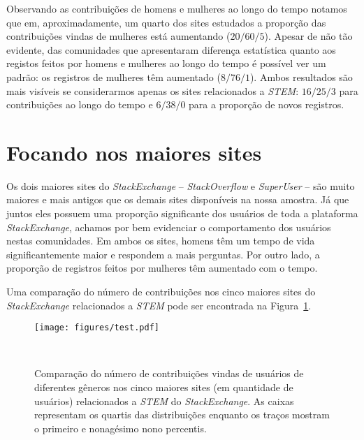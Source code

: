 Observando as contribuições de homens e mulheres ao longo do tempo notamos que em, aproximadamente, um quarto dos sites estudados a proporção das contribuições vindas de mulheres está aumentando ($20/60/5$). Apesar de não tão evidente, das comunidades que apresentaram diferença estatística quanto aos registos feitos por homens e mulheres ao longo do tempo é possível ver um padrão: os registros de mulheres têm aumentado ($8/76/1$). Ambos resultados são mais visíveis se considerarmos apenas os sites relacionados a \emph{STEM}: $16/25/3$ para contribuições ao longo do tempo e $6/38/0$ para a proporção de novos registros.

\section{Focando nos maiores sites} %

Os dois maiores sites do \emph{StackExchange} -- \emph{StackOverflow} e \emph{SuperUser} -- são muito maiores e mais antigos que os demais sites disponíveis na nossa amostra. Já que juntos eles possuem uma proporção significante dos usuários de toda a plataforma \emph{StackExchange}, achamos por bem evidenciar o comportamento dos usuários nestas comunidades. Em ambos os sites, homens têm um tempo de vida significantemente maior e respondem a mais perguntas. Por outro lado, a proporção de registros feitos por mulheres têm aumentado com o tempo.

Uma comparação do número de contribuições nos cinco maiores sites do \emph{StackExchange} relacionados a \emph{STEM} pode ser encontrada na Figura~\ref{figure:top-five}.


\begin{figure}
  \centering
  \texttt{[image: figures/test.pdf]}
  \caption[Comparação do número de contribuições na 5 maiores comunidades.]{Comparação do número de contribuições vindas de usuários de diferentes gêneros nos cinco maiores sites (em quantidade de usuários) relacionados a \emph{STEM} do \emph{StackExchange}. As caixas representam os quartis das distribuições enquanto os traços mostram o primeiro e nonagésimo nono percentis.}~\label{figure:top-five}
\end{figure}




